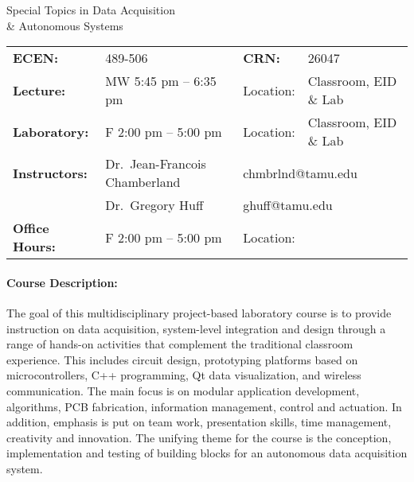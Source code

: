 \documentclass{article}
\begin{document}
\begin{center}
{\LARGE \sc Special Topics in Data Acquisition\\
\& Autonomous Systems\\[5mm]}
\end{center}

\begin{center}
\begin{tabular}{llll}
\textbf{ECEN:} & 489-506 & \textbf{CRN:} & 26047 \tabularnewline[1mm]
\textbf{Lecture:} & MW 5:45 pm -- 6:35 pm & {Location:} & Classroom, EID \& Lab \tabularnewline[1mm]
\textbf{Laboratory:} & F 2:00 pm -- 5:00 pm & {Location:} & Classroom, EID \& Lab \tabularnewline[1mm]
\textbf{Instructors:} & Dr.~Jean-Francois Chamberland & \multicolumn{2}{l}{chmbrlnd@tamu.edu} \tabularnewline[1mm]
& Dr.~Gregory Huff & \multicolumn{2}{l}{ghuff@tamu.edu} \tabularnewline[1mm]
\textbf{Office Hours:} & F 2:00 pm -- 5:00 pm & {Location:} \tabularnewline[1mm]
\end{tabular}
\end{center}

\paragraph{Course Description:}
The goal of this multidisciplinary project-based laboratory course is to provide instruction on data acquisition, system-level integration and design through a range of hands-on activities that complement the traditional classroom experience.
This includes circuit design, prototyping platforms based on microcontrollers, C++ programming, Qt data visualization, and wireless communication.
The main focus is on modular application development, algorithms, PCB fabrication, information management, control and actuation.
In addition, emphasis is put on team work, presentation skills, time management, creativity and innovation.
The unifying theme for the course is the conception, implementation and testing of building blocks for an autonomous data acquisition system.
\end{document}
